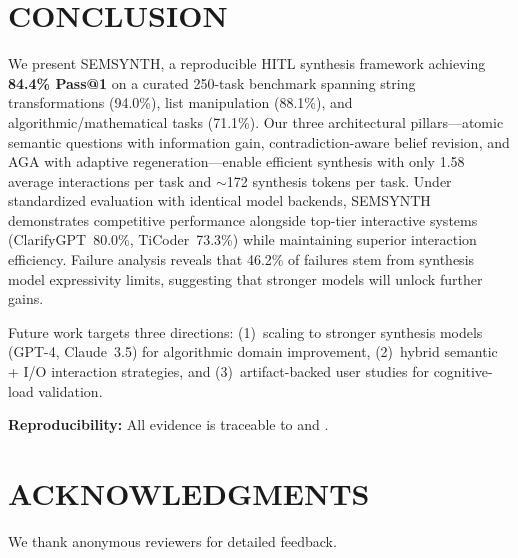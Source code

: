 \documentclass[10pt,conference]{IEEEtran}
\begin{document}
\section{CONCLUSION}\label{sec:conclusion}
We present SEMSYNTH, a reproducible HITL synthesis framework achieving \textbf{84.4\% Pass@1} on a curated 250-task benchmark spanning string transformations (94.0\%), list manipulation (88.1\%), and algorithmic/mathematical tasks (71.1\%). Our three architectural pillars---atomic semantic questions with information gain, contradiction-aware belief revision, and AGA with adaptive regeneration---enable efficient synthesis with only 1.58 average interactions per task and $\sim$172 synthesis tokens per task. Under standardized evaluation with identical model backends, SEMSYNTH demonstrates competitive performance alongside top-tier interactive systems (ClarifyGPT~80.0\%, TiCoder~73.3\%) while maintaining superior interaction efficiency. Failure analysis reveals that 46.2\% of failures stem from synthesis model expressivity limits, suggesting that stronger models will unlock further gains.

Future work targets three directions: (1)~scaling to stronger synthesis models (GPT-4, Claude~3.5) for algorithmic domain improvement, (2)~hybrid semantic + I/O interaction strategies, and (3)~artifact-backed user studies for cognitive-load validation.

\textbf{Reproducibility:} All evidence is traceable to  and .

\section*{ACKNOWLEDGMENTS}
We thank anonymous reviewers for detailed feedback.
\end{document}

